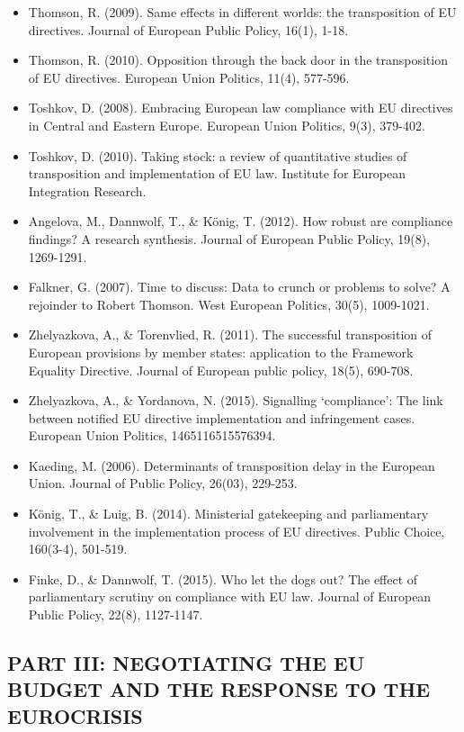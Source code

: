 \begin{itemize}
	\item Thomson, R. (2009). Same effects in different worlds: the transposition of EU directives. Journal of European Public Policy, 16(1), 1-18.
	\item Thomson, R. (2010). Opposition through the back door in the transposition of EU directives. European Union Politics, 11(4), 577-596.
	\item Toshkov, D. (2008). Embracing European law compliance with EU directives in Central and Eastern Europe. European Union Politics, 9(3), 379-402.
	\item Toshkov, D. (2010). Taking stock: a review of quantitative studies of transposition and implementation of EU law. Institute for European Integration Research.
	\item Angelova, M., Dannwolf, T., \& K{\"o}nig, T. (2012). How robust are compliance findings? A research synthesis. Journal of European Public Policy, 19(8), 1269-1291.
	\item Falkner, G. (2007). Time to discuss: Data to crunch or problems to solve? A rejoinder to Robert Thomson. West European Politics, 30(5), 1009-1021.
	\item Zhelyazkova, A., \& Torenvlied, R. (2011). The successful transposition of European provisions by member states: application to the Framework Equality Directive. Journal of European public policy, 18(5), 690-708.
	\item Zhelyazkova, A., \& Yordanova, N. (2015). Signalling ‘compliance’: The link between notified EU directive implementation and infringement cases. European Union Politics, 1465116515576394.
	\item Kaeding, M. (2006). Determinants of transposition delay in the European Union. Journal of Public Policy, 26(03), 229-253.
	\item K{\"o}nig, T., \& Luig, B. (2014). Ministerial gatekeeping and parliamentary involvement in the implementation process of EU directives. Public Choice, 160(3-4), 501-519.
	\item Finke, D., \& Dannwolf, T. (2015). Who let the dogs out? The effect of parliamentary scrutiny on compliance with EU law. Journal of European Public Policy, 22(8), 1127-1147.
	
\end{itemize}


\subsection*{PART III: NEGOTIATING THE EU BUDGET AND THE RESPONSE TO THE EUROCRISIS}

